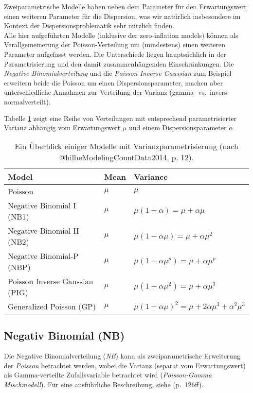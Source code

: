 \documentclass[ngerman,a4paper,]{scrartcl}
\theoremstyle{definition}
\theoremstyle{definition}
\theoremstyle{definition}
\theoremstyle{remark}
\begin{document}
Zweiparametrische Modelle haben neben dem Parameter für den Erwartungswert einen weiteren Parameter für die Dispersion, was wir natürlich insbesondere im Kontext der Dispersionsproblematik sehr nützlich finden.\\
Alle hier aufgeführten Modelle (inklusive der zero-inflation models) können als Verallgemeinerung der Poisson-Verteilung um (mindestens) einen weiteren Parameter aufgefasst werden. Die Unterschiede liegen hauptsächlich in der Parametrisierung und den damit zusammenhängenden Einschränkungen. Die \emph{Negative Binomialverteilung} und die \emph{Poisson Inverse Gaussian} zum Beispiel erweitern beide die Poisson um einen Dispersionsparameter, machen aber unterschiedliche Annahmen zur Verteilung der Varianz (gamma- vs.~invers-normalverteilt).

Tabelle \ref{tab:modelstable} zeigt eine Reihe von Verteilungen mit entsprechend parametrisierter Varianz abhängig vom Erwartungswert \(\mu\) und einem Dispersionsparameter \(\alpha\).

\begin{table}[t]

\caption{\label{tab:modelstable} Ein Überblick einiger Modelle mit Varianzparametrisierung (nach @hilbeModelingCountData2014, p. 12).}
\centering
\begin{tabular}{lll}
\toprule
Model & Mean & Variance\\
\midrule
Poisson & $\mu$ & $\mu$\\
Negative Binomial I (NB1) & $\mu$ & $\mu (1 + \alpha) = \mu + \alpha\mu$\\
Negative Binomial II (NB2) & $\mu$ & $\mu (1 + \alpha\mu) = \mu + \alpha\mu^2$\\
Negative Binomial-P (NBP) & $\mu$ & $\mu (1 + \alpha\mu^p) = \mu + \alpha\mu^p$\\
Poisson Inverse Gaussian (PIG) & $\mu$ & $\mu (1 + \alpha\mu^2) = \mu + \alpha\mu^3$\\
Generalized Poisson (GP) & $\mu$ & $\mu (1 + \alpha\mu)^2 = \mu + 2\alpha\mu^3 + \alpha^2\mu^3$\\
\bottomrule
\end{tabular}
\end{table}

\hypertarget{mod-nb}{%
\subsection{Negativ Binomial (NB)}\label{mod-nb}}

Die Negative Binomialverteilung (\emph{NB}) kann als zweiparametrische Erweiterung der \emph{Poisson} betrachtet werden, wobei die Varianz (separat vom Erwartungswert) als Gamma-verteilte Zufallsvariable betrachtet wird (\emph{Poisson-Gamma Mischmodell}). Für eine ausführliche Beschreibung, siehe \citet{hilbeModelingCountData2014} (p.~126ff).
\end{document}
